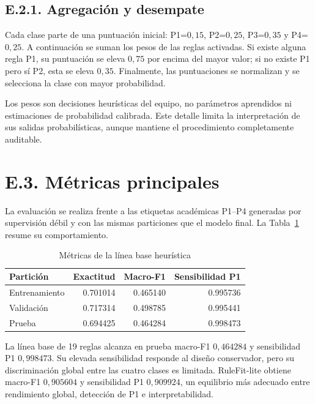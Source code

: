 \subsection*{E.2.1. Agregación y desempate}

Cada clase parte de una puntuación inicial: P1=\(0{,}15\), P2=\(0{,}25\),
P3=\(0{,}35\) y P4=\(0{,}25\). A continuación se suman los pesos de las reglas
activadas. Si existe alguna regla P1, su puntuación se eleva \(0{,}75\) por encima
del mayor valor; si no existe P1 pero sí P2, esta se eleva \(0{,}35\). Finalmente,
las puntuaciones se normalizan y se selecciona la clase con mayor probabilidad.

Los pesos son decisiones heurísticas del equipo, no parámetros aprendidos ni
estimaciones de probabilidad calibrada. Este detalle limita la interpretación de sus
salidas probabilísticas, aunque mantiene el procedimiento completamente auditable.

\section*{E.3. Métricas principales}

La evaluación se realiza frente a las etiquetas académicas P1--P4 generadas por
supervisión débil y con las mismas particiones que el modelo final. La
Tabla~\ref{tab:baseline-experto-metricas} resume su comportamiento.

\begin{table}[ht]
\centering
\caption{Métricas de la línea base heurística}
\label{tab:baseline-experto-metricas}
\small
\begin{tabular}{|l|r|r|r|}
\hline
\textbf{Partición} & \textbf{Exactitud} & \textbf{Macro-F1} & \textbf{Sensibilidad P1} \\ \hline
Entrenamiento & 0.701014 & 0.465140 & 0.995736 \\ \hline
Validación & 0.717314 & 0.498785 & 0.995441 \\ \hline
Prueba & 0.694425 & 0.464284 & 0.998473 \\ \hline
\end{tabular}
\end{table}

La línea base de 19 reglas alcanza en prueba macro-F1 \(0{,}464284\) y sensibilidad P1
\(0{,}998473\). Su elevada sensibilidad responde al diseño conservador, pero su
discriminación global entre las cuatro clases es limitada. RuleFit-lite obtiene macro-F1
\(0{,}905604\) y sensibilidad P1 \(0{,}909924\), un equilibrio más adecuado entre
rendimiento global, detección de P1 e interpretabilidad.

